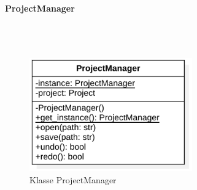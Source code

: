 \documentclass{article}
\newcommand{\classheader}[2][]{\paragraph{#2}
\mbox{}\textit{#1}\\\\}
\begin{document}
\newpage
\classheader{ProjectManager}\label{cls:ProjectManager}

\begin{figure}[H]%
    \centering
    \includegraphics[width=7cm]{entwurf/Floriane/ProjectManager.png}
    \caption{Klasse ProjectManager}
\end{figure}
\end{document}
